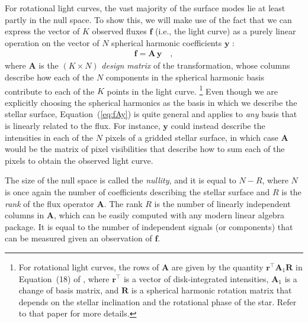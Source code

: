 \documentclass[modern]{aastex62}
\begin{document}
For rotational light curves,
the vast majority of the surface modes lie at least partly in the null
space. To show this, we will make use of the fact that we can express
the vector of $K$ observed fluxes $\mathbf{f}$ (i.e., the light curve)
as a purely linear operation on the vector of $N$
spherical harmonic coefficients $\mathbf{y}$ \citep{Luger2019}:
%
\begin{align}
    \label{eq:fAy}
    \mathbf{f} = \mathbf{A} \, \mathbf{y}
    \quad,
\end{align}
%
where $\mathbf{A}$ is the $(K \times N)$ \emph{design matrix} of the transformation, whose columns
describe how each of the $N$ components in the spherical harmonic basis contribute
to each of the $K$ points in the light curve.%
\footnote{%
    For rotational light curves, the rows of $\mathbf{A}$ are given by the
    quantity $\mathbf{r}^\top \mathbf{A}_1 \mathbf{R}$ in Equation~(18) of
    \citet{Luger2019}, where $\mathbf{r}^\top$ is a vector of disk-integrated
    intensities, $\mathbf{A}_1$ is a change of basis matrix, and $\mathbf{R}$
    is a spherical harmonic rotation matrix that depends on the stellar inclination
    and the rotational phase of the star. Refer to that paper for more details.
}
%
Even though we are explicitly choosing the spherical harmonics as the basis in which
we describe the stellar surface, Equation~(\ref{eq:fAy}) is quite general and applies to
\emph{any} basis that is linearly related to the flux. For instance, $\mathbf{y}$
could instead describe the intensities in each of the $N$ pixels of a gridded stellar
surface, in which case $\mathbf{A}$ would be the matrix of pixel visibilities that describe
how to sum each of the pixels to obtain the observed light curve.

The size of the null space is called the \emph{nullity}, and it is equal to
$N - R$, where $N$ is once again the number of coefficients describing the
stellar surface and $R$ is the \emph{rank} of the flux operator $\mathbf{A}$.
The rank $R$ is the number of linearly independent columns in $\mathbf{A}$, which
can be easily computed with any modern linear algebra package. It is equal
to the number of independent signals (or components) that can be measured given
an observation of $\mathbf{f}$.
\end{document}
